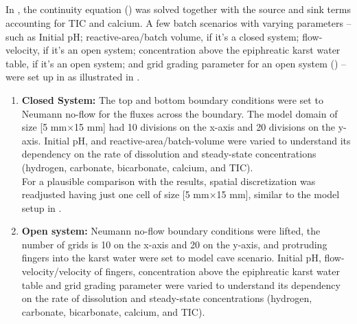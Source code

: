 \subsection{\DuMuX} \label{ssec:DumuxIntro}
In \DuMuX, the continuity equation () was solved together with the source and sink terms accounting for 
TIC and calcium. A few batch scenarios with varying parameters -- such as Initial pH; reactive-area/batch volume, if it's a closed system; 
flow-velocity, if it's an open system;  concentration above the epiphreatic karst water table, if it's an open system; and grid grading 
parameter for an open system () -- were set up in \DuMuX as illustrated in . 
\begin{enumerate}
    \item \textbf{Closed System:} The top and bottom boundary 
    conditions were set to Neumann no-flow for the fluxes across the boundary. The model domain of size [5 mm$\times$15 mm] had 
    10 divisions on the x-axis and 20 divisions on the y-axis. Initial pH, and reactive-area/batch-volume 
    were varied to understand its dependency on the rate of dissolution and steady-state concentrations (hydrogen, carbonate, bicarbonate, calcium, and TIC). \\
    For a plausible comparison with the \MATLAB results, spatial discretization was readjusted having just one cell of size [5 mm$\times$15 mm], 
    similar to the model setup in \MATLAB.

    \item \textbf{Open system:} Neumann no-flow boundary conditions were lifted, the number of grids is 10 on the x-axis and 20 on the y-axis, 
    and  protruding  fingers into the karst water were set to model cave scenario. Initial pH, flow-velocity/velocity of fingers,  
    concentration above the epiphreatic karst water table and grid grading parameter were varied to understand its dependency on the rate 
    of dissolution and steady-state concentrations (hydrogen, carbonate, bicarbonate, calcium, and TIC).
\end{enumerate}


